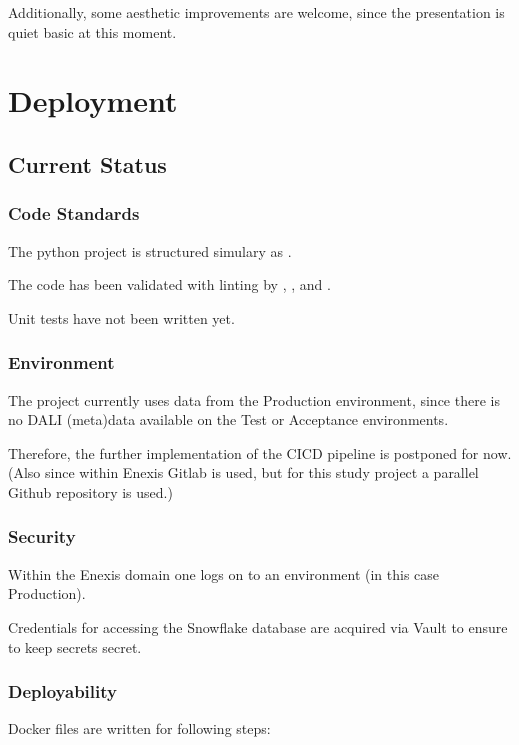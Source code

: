\documentclass[letterpaper,10pt,english]{sphinxmanual}
\let\sphinxpxdimen\pdfpxdimen\else\newdimen\sphinxpxdimen
\begin{document}
Additionally, some aesthetic improvements are welcome, since the presentation is quiet basic at this moment.


\chapter{Deployment}
\label{\detokenize{deployment:deployment}}\label{\detokenize{deployment::doc}}

\section{Current Status}
\label{\detokenize{deployment:current-status}}

\subsection{Code Standards}
\label{\detokenize{deployment:code-standards}}
The python project is structured simulary as .

The code has been validated with linting by , , and .

Unit tests have not been written yet.


\subsection{Environment}
\label{\detokenize{deployment:environment}}
The project currently uses data from the Production environment, since there is no DALI (meta)data available on the Test or Acceptance environments.

Therefore, the further implementation of the CICD pipeline is postponed for now.
(Also since within Enexis Gitlab is used, but for this study project a parallel Github repository is used.)


\subsection{Security}
\label{\detokenize{deployment:security}}
Within the Enexis domain one logs on to an environment (in this case Production).

Credentials for accessing the Snowflake database are acquired via Vault to ensure to keep secrets secret.


\subsection{Deployability}
\label{\detokenize{deployment:deployability}}
Docker files are written for following steps:
\begin{quote}

\noindent{\hspace*{\fill}\sphinxincludegraphics[width=800\sphinxpxdimen]{{process_triggered}.png}\hspace*{\fill}}
\end{quote}
\end{document}
